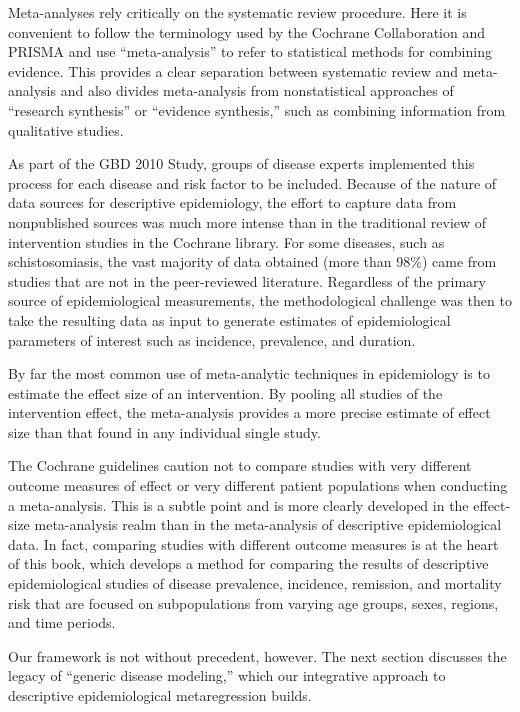 Meta-analyses rely critically on the systematic review procedure. Here
it is convenient to follow the terminology used by the Cochrane
Collaboration and PRISMA and use ``meta-analysis'' to refer to
statistical methods for combining evidence.  This provides a clear
separation between systematic review and meta-analysis and also divides
meta-analysis from nonstatistical approaches of ``research
synthesis'' or ``evidence synthesis,'' such as combining information
from qualitative studies.

As part of the GBD 2010 Study, groups of disease experts implemented
this process for each disease and risk factor to be
included. Because of the nature of data sources for descriptive
epidemiology, the effort to capture data from nonpublished sources
was much more intense than in the traditional review of
intervention studies in the Cochrane library.  For some diseases, such
as schistosomiasis, the vast majority of data obtained (more than
98\%) came from studies that are not in the peer-reviewed literature.
Regardless of the primary source of epidemiological measurements, the
methodological challenge was then to take the resulting data as input
to generate estimates of epidemiological parameters of interest such
as incidence, prevalence, and duration.

By far the most common use of meta-analytic techniques in epidemiology is to estimate
the effect size of an intervention.  By pooling all studies of the
intervention effect, the meta-analysis provides a more precise
estimate of effect size than that found in any individual single
study.

The Cochrane guidelines caution not to compare studies with very
different outcome measures of effect or very different patient
populations when conducting a
meta-analysis.\cite{_cochrane_2012} This is a subtle point
and is more clearly developed in the effect-size meta-analysis realm
than in the meta-analysis of descriptive epidemiological data.  In
fact, comparing studies with different outcome measures is at the
heart of this book, which develops a method for comparing the results
of descriptive epidemiological studies of disease prevalence,
incidence, remission, and mortality risk that are focused on
subpopulations from varying age groups, sexes, regions, and time
periods.

Our framework is not without precedent, however.  The next section discusses the
legacy of ``generic disease modeling,'' which our integrative approach
to descriptive epidemiological metaregression builds.



